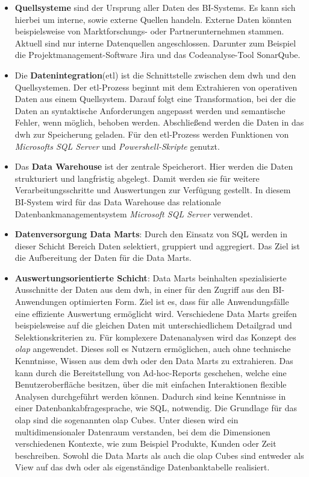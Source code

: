 \begin{itemize}
\item \textbf{Quellsysteme} sind der Ursprung aller Daten des BI-Systems. Es kann sich hierbei um interne, sowie externe Quellen handeln. Externe Daten könnten beispielsweise von Marktforschungs- oder Partnerunternehmen stammen. Aktuell sind nur interne Datenquellen angeschlossen. Darunter zum Beispiel die Projektmanagement-Software Jira und das Codeanalyse-Tool SonarQube.
\item Die \textbf{Datenintegration}(\ac{etl}) ist die Schnittstelle zwischen dem \ac{dwh} und den Quellsystemen. Der \acs{etl}-Prozess beginnt mit dem Extrahieren von operativen Daten aus einem Quellsystem. Darauf folgt eine Transformation, bei der die Daten an syntaktische Anforderungen angepasst werden und semantische Fehler, wenn möglich, behoben werden. Abschließend werden die Daten in das \ac{dwh} zur Speicherung geladen. Für den \acs{etl}-Prozess werden Funktionen von \textit{Microsofts SQL Server} und \textit{Powershell-Skripte} genutzt.
\item Das \textbf{Data Warehouse} ist der zentrale Speicherort. Hier werden die Daten strukturiert und langfristig abgelegt. Damit werden sie für weitere Verarbeitungsschritte und Auswertungen zur Verfügung gestellt. In diesem BI-System wird für das Data Warehouse das relationale Datenbankmanagementsystem \textit{Microsoft SQL Server} verwendet.
\item \textbf{Datenversorgung Data Marts}: Durch den Einsatz von SQL werden in dieser Schicht Bereich Daten selektiert, gruppiert und aggregiert. Das Ziel ist die Aufbereitung der Daten für die Data Marts.
\item \textbf{Auswertungsorientierte Schicht}: Data Marts beinhalten spezialisierte Ausschnitte der Daten aus dem \ac{dwh}, in einer für den Zugriff aus den BI-Anwendungen optimierten Form. Ziel ist es, dass für alle Anwendungsfälle eine effiziente Auswertung ermöglicht wird. Verschiedene Data Marts greifen beispielsweise auf die gleichen Daten mit unterschiedlichem Detailgrad und Selektionskriterien zu. Für komplexere Datenanalysen wird das Konzept des \textit{\ac{olap}} angewendet. Dieses soll es Nutzern ermöglichen, auch ohne technische Kenntnisse, Wissen aus dem \ac{dwh} oder den Data Marts zu extrahieren. Das kann durch die Bereitstellung von Ad-hoc-Reports geschehen, welche eine Benutzeroberfläche besitzen, über die mit einfachen Interaktionen flexible Analysen durchgeführt werden können. Dadurch sind keine Kenntnisse in einer Datenbankabfragesprache, wie SQL, notwendig. Die Grundlage für das \ac{olap} sind die sogenannten \ac{olap} Cubes. Unter diesen wird ein multidimensionaler Datenraum verstanden, bei dem die Dimensionen verschiedenen Kontexte, wie zum Beispiel Produkte, Kunden oder Zeit beschreiben. Sowohl die Data Marts als auch die \ac{olap} Cubes sind entweder als View auf das \ac{dwh} oder als eigenständige Datenbanktabelle realisiert.

\end{itemize}
